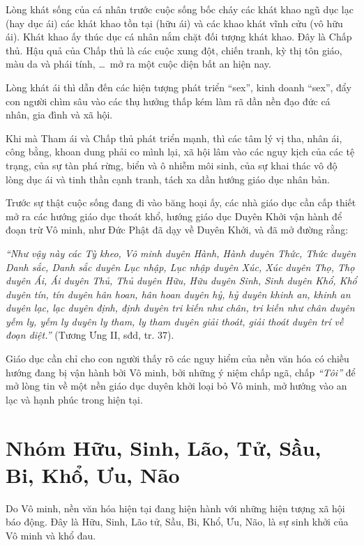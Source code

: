 Lòng khát sống của cá nhân trước cuộc sống bốc cháy các khát khao ngũ dục lạc (hay dục ái) các khát khao tồn tại (hữu ái) và các khao khát vĩnh cửu (vô hữu ái). Khát khao ấy thúc dục cá nhân nắm chặt đối tượng khát khao. Đây là Chấp thủ. Hậu quả của Chấp thủ là các cuộc xung đột, chiến tranh, kỳ thị tôn giáo, màu da và phái tính, \ldots ~mở ra một cuộc diện bất an hiện nay.

Lòng khát ái thì dẫn đến các hiện tượng phát triển ``sex'', kinh doanh ``sex'', đẩy con người chìm sâu vào các thụ hưởng thấp kém làm rã dần nền đạo đức cá nhân, gia đình và xã hội.

Khi mà Tham ái và Chấp thủ phát triển mạnh, thì các tâm lý vị tha, nhân ái, công bằng, khoan dung phải co mình lại, xã hội lâm vào các nguy kịch của các tệ trạng, của sự tàn phá rừng, biển và ô nhiễm môi sinh, của sự khai thác vô độ lòng dục ái và tinh thần cạnh tranh, tách xa dần hướng giáo dục nhân bản.

Trước sự thật cuộc sống đang đi vào băng hoại ấy, các nhà giáo dục cần cấp thiết mở ra các hướng giáo dục thoát khổ, hướng giáo dục Duyên Khởi vận hành để đoạn trừ Vô minh, như Đức Phật đã dạy về Duyên Khởi, và đã mở đường rằng:

\emph{``Như vậy này các Tỳ kheo, Vô minh duyên Hành, Hành duyên Thức, Thức duyên Danh sắc, Danh sắc duyên Lục nhập, Lục nhập duyên Xúc, Xúc duyên Thọ, Thọ duyên Ái, Ái duyên Thủ, Thủ duyên Hữu, Hữu duyên Sinh, Sinh duyên Khổ, Khổ duyên tín, tín duyên hân hoan, hân hoan duyên hỷ, hỷ duyên khinh an, khinh an duyên lạc, lạc duyên định, định duyên tri kiến như chân, tri kiến như chân duyên yếm ly, yếm ly duyên ly tham, ly tham duyên giải thoát, giải thoát duyên trí về đoạn diệt.''} (Tương Ưng II, sđd, tr. 37).

Giáo dục cần chỉ cho con người thấy rõ các nguy hiểm của nền văn hóa có chiều hướng đang bị vận hành bởi Vô minh, bởi những ý niệm chấp ngã, chấp \emph{``Tôi''} để mở lòng tin về một nền giáo dục duyên khởi loại bỏ Vô minh, mở hướng vào an lạc và hạnh phúc trong hiện tại.


\section{Nhóm Hữu, Sinh, Lão, Tử, Sầu, Bi, Khổ, Ưu, Não} %
\label{sec:huu_sinh_lao_tu_sau_bi}

Do Vô minh, nền văn hóa hiện tại đang hiện hành với những hiện tượng xã hội báo động. Đây là Hữu, Sinh, Lão tử, Sầu, Bi, Khổ, Ưu, Não, là sự sinh khởi của Vô minh và khổ đau.


